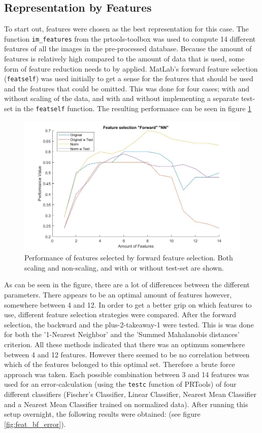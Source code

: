 \subsection{Representation by Features}
To start out, features were chosen as the best representation for this case. The function \texttt{im\_features} from the prtools-toolbox was used to compute 14 different features of all the images in the pre-processed database. Because the amount of features is relatively high compared to the amount of data that is used, some form of feature reduction needs to by applied. MatLab's forward feature selection (\texttt{featself}) was used initially to get a sense for the features that should be used and the features that could be omitted. This was done for four cases; with and without scaling of the data, and with and without implementing a separate test-set in the \texttt{featself} function. The resulting performance can be seen in figure \ref{fig:featsel_perf}
\begin{figure}[H]
	\centering
	\includegraphics[scale=0.45]{images/featsel_perf.jpg}
	\caption{Performance of features selected by forward feature selection. Both scaling and non-scaling, and with or without test-set are shown.}
	\label{fig:featsel_perf}
\end{figure}
\noindent As can be seen in the figure, there are a lot of differences between the different parameters. There appears to be an optimal amount of features however, somewhere between 4 and 12. In order to get a better grip on which features to use, different feature selection strategies were compared. After the forward selection, the backward and the plus-2-takeaway-1 were tested. This is was done for both the '1-Nearest Neighbor' and the 'Summed Mahalanobis distances' criterion. All these methods indicated that there was an optimum somewhere between 4 and 12 features. However there seemed to be no correlation between which of the features belonged to this optimal set. Therefore a brute force approach was taken. Each possible combination between 3 and 14 features was used for an error-calculation (using the \texttt{testc}  function of PRTools) of four different classifiers (Fischer's Classifier, Linear Classifier, Nearest Mean Classifier and a Nearest Mean Classifier trained on normalized data). After running this setup overnight, the following results were obtained: (see figure \ref{fig:feat_bf_error}).
